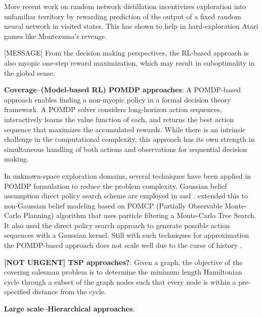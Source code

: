 \documentclass{article}
\newcommand{\ph}[1]{{\textbf{#1}:}} %
\begin{document}
More recent work on random network distillation \cite{rnd} incentivizes exploration into unfamiliar territory by rewarding prediction of the output of a fixed random neural network in visited states. This has shown to help in hard-exploration Atari games like Montezuma's revenge.

[MESSAGE] From the decision making perspectives, the RL-based approach is also myopic one-step reward maximization, which may result in suboptimality in the global sense.


\ph{Coverage--(Model-based RL) POMDP approaches}
%
A POMDP-based approach enables finding a non-myopic policy in a formal decision theory framework.
A POMDP solver considers long-horizon action sequences, interactively learns the value function of each, and returns the best action sequence that maximizes the accumulated rewards.
While there is an intrinsic challenge in the computational complexity, this approach has its own strength in simultaneous handling of both actions and observations for sequential decision making.

In unknown-space exploration domains, several techniques have been applied in POMDP formulation to reduce the problem complexity.
Gaussian belief assumption direct policy search scheme are employed in \cite{martinez2009bayesian} and \cite{indelman2015planning}.
\citet{Lauri2016planning} extended this to non-Gaussian belief modeling based on POMCP (Partially Observable Monte-Carlo Planning) \cite{silver2010monte} algorithm that uses particle filtering a Monte-Carlo Tree Search.
It also used the direct policy search approach to generate possible action sequences with a Gaussian kernel.
Still with such techniques for approximation the POMDP-based approach does not scale well due to the curse of history \cite{Pineau03}.



\ph{[NOT URGENT] TSP approaches?}
Given a graph, the objective of the covering salesman problem is to determine the minimum length Hamiltonian cycle through a subset of the graph nodes such that every node is within a pre-specified distance from the cycle.  



\ph{Large scale--Hierarchical approaches}
\end{document}
